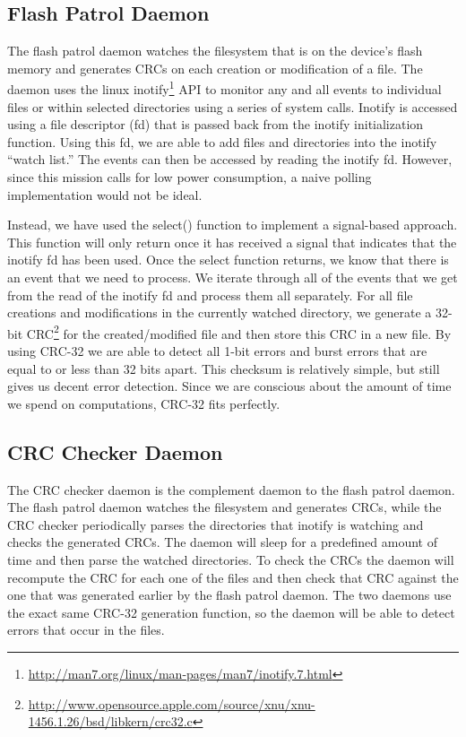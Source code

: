 \subsection{Flash Patrol Daemon}
The flash patrol daemon watches the filesystem that is on the device's flash memory and 
generates CRCs on each creation or modification of a file. The daemon uses the linux 
inotify\footnote{\url{http://man7.org/linux/man-pages/man7/inotify.7.html}} API 
to monitor any and all events to individual files or within selected directories 
using a series of system calls. Inotify is accessed using a file descriptor (fd)
that is passed back from the inotify initialization function. Using this fd, we are able to add files 
and directories into the inotify ``watch list.'' The events can then be accessed 
by reading the inotify fd. However, since this mission calls for low power 
consumption, a naive polling implementation would not be ideal.

Instead, we have used the select() function to implement a signal-based approach. This function
will only return once it has received a signal that indicates that the inotify fd has been used.
Once the select function returns, we know that there is an event that we need to process. We iterate
through all of the events that we get from the read of the inotify fd and process them all separately.
For all file creations and modifications in the currently watched directory, we generate a 32-bit 
CRC\footnote{\url{http://www.opensource.apple.com/source/xnu/xnu-1456.1.26/bsd/libkern/crc32.c}} 
for the created/modified file and then store this CRC in a new file. By using CRC-32 we are
able to detect all 1-bit errors and burst errors that are equal to or less than 32 bits apart. This checksum is
relatively simple, but still gives us decent error detection. Since we are conscious about the amount
of time we spend on computations, CRC-32 fits perfectly. 

\subsection{CRC Checker Daemon}
The CRC checker daemon is the complement daemon to the flash patrol daemon. The flash
patrol daemon watches the filesystem and generates CRCs, while the CRC checker periodically
parses the directories that inotify is watching and checks the generated CRCs. The daemon will 
sleep for a predefined amount of time and then parse the watched directories. To check the CRCs
the daemon will recompute the CRC for each one of the files and then check that CRC against the
one that was generated earlier by the flash patrol daemon. The two daemons use the exact same
CRC-32 generation function, so the daemon will be able to detect errors that occur in the 
files. 














